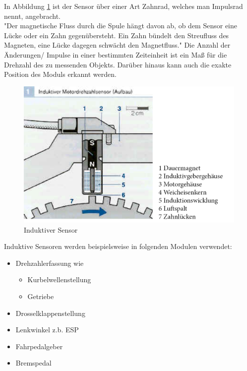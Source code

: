 			In Abbildung \ref{fig:TS03} ist der Sensor über einer Art Zahnrad, welches man Impulsrad nennt, angebracht.\\
            
            "Der magnetische Fluss durch die Spule hängt davon ab, ob dem Sensor eine Lücke oder ein Zahn gegenübersteht. Ein Zahn bündelt den Streufluss des Magneten, eine Lücke dagegen schwächt den Magnetfluss." \cite{TS_ind_funkt}  
			Die Anzahl der Änderungen/ Impulse in einer bestimmten Zeiteinheit ist ein Maß für die Drehzahl des zu messenden Objekts. Darüber hinaus kann auch die exakte Position des Moduls erkannt werden.\\					
            
                \begin{figure}
                    \centering
			    	\includegraphics{Induktiv_mit_legende.jpg}
                    \caption[www.kfztech.de/kfztechnik/elo/sensoren/induktivgeber.htm]{Induktiver Sensor}
                    \label{fig:TS03}
                \end{figure}

			Induktive Sensoren werden beispielsweise in folgenden Modulen verwendet:
			
			\begin{itemize}
				\item Drehzahlerfassung wie
					\begin{itemize}
						\item Kurbelwellenstellung
						\item Getriebe
					\end{itemize}	
				\item Drosselklappenstellung
				\item Lenkwinkel z.b. ESP
				\item Fahrpedalgeber
				\item Bremspedal
			\end{itemize}
		
